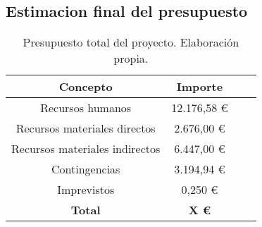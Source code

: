 \subsection{Estimacion final del presupuesto}


\begin{table}[H]
    \begin{center}
    \begin{tabular}{|c|c|c|c|}
        \hline
        \textbf{Concepto} & \textbf{Importe}\\ 
        \hline
        Recursos humanos & 12.176,58 € \\
        Recursos materiales directos & 2.676,00 € \\
        Recursos materiales indirectos  & 6.447,00 € \\
        Contingencias & 3.194,94 € \\
        Imprevistos & 0,250 € \\
        \hline
        \textbf{Total} & \textbf{X €} \\
        \hline
    \end{tabular}
    \caption{Presupuesto total del proyecto. Elaboración propia.}
    \label{tab:presupuesto_total}
    \end{center}
\end{table}

